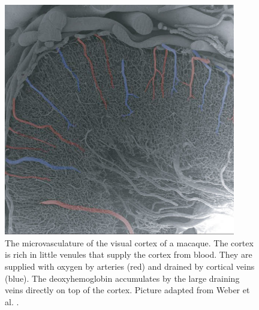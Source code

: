 \begin{figure}[!ht]
	\centering
	\includegraphics[width=0.9\textwidth, clip=true]{./Chapters/01_Introduction/Images/Microvasculature}
	\caption{The microvasculature of the visual cortex of a macaque. The cortex is rich in little venules that supply the cortex from blood. They are supplied with oxygen by arteries (red) and drained by cortical veins (blue). The deoxyhemoglobin accumulates by the large draining veins directly on top of the cortex. Picture adapted from Weber et al. \cite{Weber2008}.}
	\label{fig:microvasulature}
\end{figure}